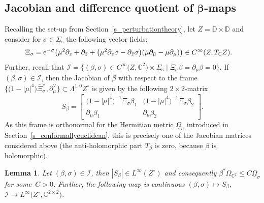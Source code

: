 \documentclass[pdftex]{sigma}
\numberwithin{equation}{section}
\newtheorem{Lemma}[Theorem]{Lemma}
\theoremstyle{definition}
\newcommand{\C}{\mathbb{C}} %
\newcommand{\DD}{\mathbb{D}} %
\newcommand{\1}{{\bf 1}}
\newcommand{\Om}{{\underline{\Omega}}}
\begin{document}
\subsection[Jacobian and difference quotient of beta-maps]{Jacobian and difference quotient of $\boldsymbol{\beta}$-maps}

Recalling the set-up from Section~\ref{s_perturbationtheory}, let $Z=\DD\times \DD$ and consider for $\sigma\in \Sigma_\mathrm{s}$ the following vector fields:
\begin{align*}
	\Xi_\sigma&={\rm e}^{-\sigma} \bigl(\mu^2\partial_z+\partial_{\bar z} + \bigl(\mu^2 \partial_z\sigma - \partial_{\bar z}\sigma\bigr)(\bar \mu \partial_{\bar \mu} - \mu \partial_\mu) \bigr) \in C^\infty(Z,T_\C Z).
\end{align*}
Further, recall that
$
\mathcal I=\big\{(\beta,\sigma)\in C^\infty\bigl(Z,\C^2\bigr)\times \Sigma_\mathrm{s}\mid \Xi_\sigma\beta = \partial_{\bar \mu} \beta=0\big\}
$. If $(\beta,\sigma)\in \mathcal I$, then the Jacobian of $\beta$ with respect to the frame $\big\{\bigl(1-|\mu|^4\bigr)\bar \Xi_\sigma^\vee,\partial_\mu^\vee\big\}\subset \Lambda^{1,0}Z^\circ$ is given by the following $2\times 2$-matrix
\[
		S_\beta = \begin{bmatrix}
			\bigl(1-|\mu|^4\bigr)^{-1}\bar \Xi_\sigma \beta_1 & \bigl(1-|\mu|^4\bigr)^{-1}\bar \Xi_\sigma \beta_2\\
			\partial_\mu \beta_1 & \partial_\mu \beta_2
		\end{bmatrix}.
\]
As this frame is orthonormal for the Hermitian metric $\Om_\sigma$ introduced in Section~\ref{s_conformallyeuclidean}, this is precisely one of the Jacobian matrices considered above (the anti-holomorphic part $T_\beta$ is zero, because $\beta$ is holomorphic).


\begin{Lemma}\label{sbetacts} Let $(\beta,\sigma)\in \mathcal I$, then $|S_\beta|\in L^\infty(Z^\circ)$ and consequently $\beta^*\Omega_{\C^2} \le C \Om_\sigma$ for some~${C>0}$. Further, the following map is continuous
$(\beta,\sigma)\mapsto S_\beta$, $ \mathcal I\rightarrow L^\infty\bigl(Z^\circ,\C^{2\times 2}\bigr)$.
\end{Lemma}
\end{document}
